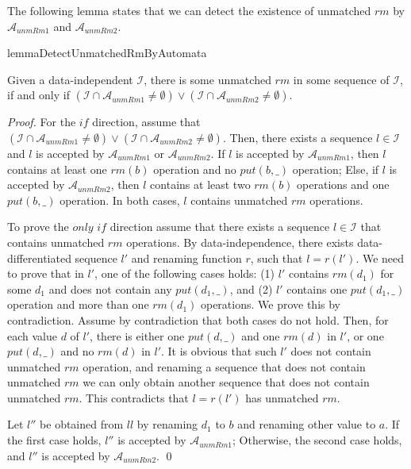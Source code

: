 The following lemma states that we can detect the existence of unmatched $\textit{rm}$ by $\mathcal{A}_{\textit{unmRm1}}$ and $\mathcal{A}_{\textit{unmRm2}}$.

\begin{restatable}{lemma}{DetectUnmatchedRmByAutomata}
\label{lemma:detect unmatched rm by automata}

Given a data-independent $\mathcal{I}$, there is some unmatched $\textit{rm}$ in some sequence of $\mathcal{I}$, if and only if $( \mathcal{I} \cap \mathcal{A}_{\textit{unmRm1}} \neq \emptyset) \vee ( \mathcal{I} \cap \mathcal{A}_{\textit{unmRm2}} \neq \emptyset )$.
\end{restatable}

\begin {proof}

For the $\textit{if}$ direction, assume that $( \mathcal{I} \cap \mathcal{A}_{\textit{unmRm1}} \neq \emptyset) \vee ( \mathcal{I} \cap \mathcal{A}_{\textit{unmRm2}} \neq \emptyset )$. Then, there exists a sequence $l \in \mathcal{I}$ and $l$ is accepted by $\mathcal{A}_{\textit{unmRm1}}$ or $\mathcal{A}_{\textit{unmRm2}}$. If $l$ is accepted by $\mathcal{A}_{\textit{unmRm1}}$, then $l$ contains at least one $\textit{rm}(b)$ operation and no $\textit{put}(b,\_)$ operation; Else, if $l$ is accepted by $\mathcal{A}_{\textit{unmRm2}}$, then $l$ contains at least two $\textit{rm}(b)$ operations and one $\textit{put}(b,\_)$ operation. In both cases, $l$ contains unmatched $\textit{rm}$ operations.

To prove the $\textit{only if}$ direction assume that there exists a sequence $l \in \mathcal{I}$ that contains unmatched $\textit{rm}$ operations. By data-independence, there exists data-differentiated sequence $l'$ and renaming function $r$, such that $l=r(l')$. We need to prove that in $l'$, one of the following cases holds: (1) $l'$ contains $\textit{rm}(d_1)$ for some $d_1$ and does not contain any $\textit{put}(d_1,\_)$, and (2) $l'$ contains one $\textit{put}(d_1,\_)$ operation and more than one $\textit{rm}(d_1)$ operations. We prove this by contradiction. Assume by contradiction that both cases do not hold. Then, for each value $d$ of $l'$, there is either one $\textit{put}(d,\_)$ and one $\textit{rm}(d)$ in $l'$, or one $\textit{put}(d,\_)$ and no $\textit{rm}(d)$ in $l'$. It is obvious that such $l'$ does not contain unmatched $\textit{rm}$ operation, and renaming a sequence that does not contain unmatched $\textit{rm}$ we can only obtain another sequence that does not contain unmatched $\textit{rm}$. This contradicts that $l=r(l')$ has unmatched $\textit{rm}$.

Let $l''$ be obtained from $ll$ by renaming $d_1$ to $b$ and renaming other value to $a$. If the first case holds, $l''$ is accepted by $\mathcal{A}_{\textit{unmRm1}}$; Otherwise, the second case holds, and $l''$ is accepted by $\mathcal{A}_{\textit{unmRm2}}$. \qed
\end {proof}

